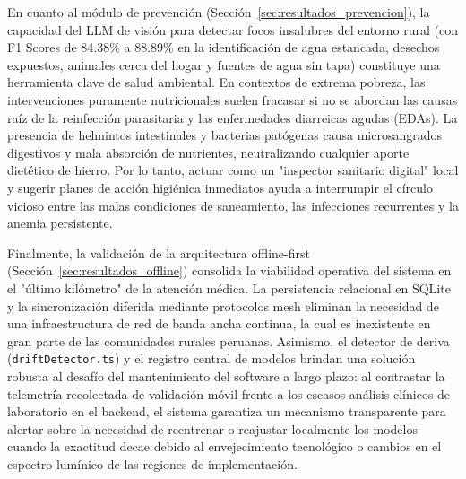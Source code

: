 En cuanto al módulo de prevención (Sección~\ref{sec:resultados_prevencion}), la capacidad del LLM de visión para detectar focos insalubres del entorno rural (con F1 Scores de 84.38\% a 88.89\% en la identificación de agua estancada, desechos expuestos, animales cerca del hogar y fuentes de agua sin tapa) constituye una herramienta clave de salud ambiental. En contextos de extrema pobreza, las intervenciones puramente nutricionales suelen fracasar si no se abordan las causas raíz de la reinfección parasitaria y las enfermedades diarreicas agudas (EDAs). La presencia de helmintos intestinales y bacterias patógenas causa microsangrados digestivos y mala absorción de nutrientes, neutralizando cualquier aporte dietético de hierro. Por lo tanto, actuar como un "inspector sanitario digital" local y sugerir planes de acción higiénica inmediatos ayuda a interrumpir el círculo vicioso entre las malas condiciones de saneamiento, las infecciones recurrentes y la anemia persistente.

Finalmente, la validación de la arquitectura offline-first (Sección~\ref{sec:resultados_offline}) consolida la viabilidad operativa del sistema en el "último kilómetro" de la atención médica. La persistencia relacional en SQLite y la sincronización diferida mediante protocolos mesh eliminan la necesidad de una infraestructura de red de banda ancha continua, la cual es inexistente en gran parte de las comunidades rurales peruanas. Asimismo, el detector de deriva (\texttt{driftDetector.ts}) y el registro central de modelos brindan una solución robusta al desafío del mantenimiento del software a largo plazo: al contrastar la telemetría recolectada de validación móvil frente a los escasos análisis clínicos de laboratorio en el backend, el sistema garantiza un mecanismo transparente para alertar sobre la necesidad de reentrenar o reajustar localmente los modelos cuando la exactitud decae debido al envejecimiento tecnológico o cambios en el espectro lumínico de las regiones de implementación.

